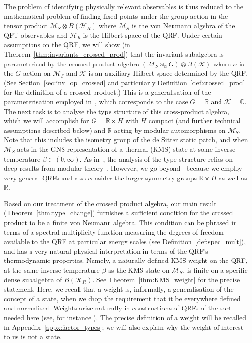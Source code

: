 \documentclass[sn-mathphys-num]{sn-jnl}%
\newcommand{\CC}{\mathbb{C}}
\newcommand{\RR}{\mathbb{R}}
\newcommand{\HH}{\mathcal{H}}
\newcommand{\KK}{\mathcal{K}}
\newcommand{\MM}{\mathcal{M}}
\numberwithin{equation}{section}
\theoremstyle{thmstyleone}%
\theoremstyle{thmstyletwo}%
\theoremstyle{thmstylethree}%
\begin{document}
The problem of identifying physically relevant observables is thus reduced to the mathematical problem of finding fixed points under the group action in the tensor product $\MM_S\otimes B(\HH_R)$ where $\MM_S$ is the von Neumann algebra of the QFT observables and $\HH_R$ is the Hilbert space of the QRF. Under certain assumptions on the QRF, we will show (in Theorem~\ref{thm:invariants_crossed_prod}) that the invariant subalgebra is parameterised by the crossed product algebra $(\MM_S\rtimes_\alpha G)\otimes B(\KK)$ where $\alpha$ is the $G$-action on $\MM_S$ and $\KK$ is an auxiliary Hilbert space determined by the QRF. (See Section~\ref{sec:inv_op_crossed} and particularly Definition~\ref{def:crossed_prod} for the definition of a crossed product.) This is a generalisation of the parameterisation employed in~\cite{chandrasekaran2023algebra}, which corresponds to the case $G=\RR$ and $\KK=\CC$. The next task is to analyse the type structure of this cross-product algebra, which we will accomplish for $G=\RR\times H$ with $H$ compact (and further technical assumptions described below) and $\RR$ acting by modular automorphisms on $\MM_S$. Note that this includes the isometry group of the de Sitter static patch, and when $\MM_S$ acts in the GNS representation of a thermal (KMS) state at some inverse temperature $\beta\in (0,\infty)$. As in~\cite{chandrasekaran2023algebra}, the analysis of the type structure relies on deep results from modular theory~\cite{vanDaele:1978, Takesaki1973duality,takesaki1970tomita}.
However, we go beyond~\cite{chandrasekaran2023algebra} because we employ very general QRFs and also consider the larger symmetry groups $\RR\times H$ as well as $\RR$. 

Based on our treatment of the crossed product algebra, our main result (Theorem~\ref{thm:type_change}) furnishes a sufficient condition 
for the crossed product to be a finite von Neumann algebra. This condition can be phrased in terms of a spectral multiplicity function measuring the degrees of freedom available to the QRF at particular energy scales (see Definition~\ref{def:spec_mult}), and has a very natural physical interpretation in terms of the QRF's thermodynamic properties. Namely, a naturally defined KMS weight on the QRF, at the same inverse temperature $\beta$ as the KMS state on $\MM_S$, is finite on a specific dense subalgebra of $B(\HH_R)$. See Theorem~\ref{thm:KMS_weight} for the precise statement. Here, we recall that a weight is, informally, a generalisation of the concept of a state, when we drop the requirement that it be everywhere defined and normalised. Weights arise naturally in constructions of QRFs of the sort needed here (see, for instance \cite{BFH09}). The precise definition of a weight will be recalled in Appendix~\ref{appx:factor_types}; we will also explain why the weight of interest to us is not a state.
\end{document}
